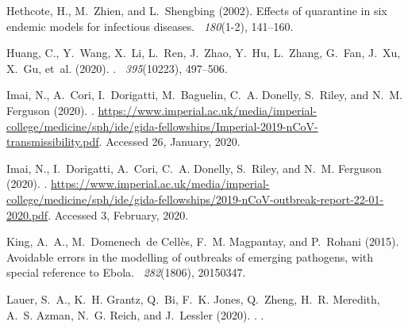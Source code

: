 \documentclass[12pt]{article}
\begin{document}
\begin{thebibliography}{}
Hethcote, H., M.~Zhien, and L.~Shengbing (2002).
\newblock Effects of quarantine in six endemic models for infectious diseases.
~{\em 180\/}(1-2), 141--160.

Huang, C., Y.~Wang, X.~Li, L.~Ren, J.~Zhao, Y.~Hu, L.~Zhang, G.~Fan, J.~Xu,
  X.~Gu, et~al. (2020).
.
~{\em 395\/}(10223), 497--506.

Imai, N., A.~Cori, I.~Dorigatti, M.~Baguelin, C.~A. Donelly, S.~Riley, and
  N.~M. Ferguson (2020).
.
\newblock
  \url{https://www.imperial.ac.uk/media/imperial-college/medicine/sph/ide/gida-fellowships/Imperial-2019-nCoV-transmissibility.pdf}.
  Accessed 26, January, 2020.

Imai, N., I.~Dorigatti, A.~Cori, C.~A. Donelly, S.~Riley, and N.~M. Ferguson
  (2020).
.
\newblock
  \url{https://www.imperial.ac.uk/media/imperial-college/medicine/sph/ide/gida-fellowships/2019-nCoV-outbreak-report-22-01-2020.pdf}.
  Accessed 3, February, 2020.

King, A.~A., M.~Domenech~de Cell{\`e}s, F.~M. Magpantay, and P.~Rohani (2015).
\newblock Avoidable errors in the modelling of outbreaks of emerging pathogens,
  with special reference to {Ebola}.
~{\em 282\/}(1806), 20150347.

Lauer, S.~A., K.~H. Grantz, Q.~Bi, F.~K. Jones, Q.~Zheng, H.~R. Meredith, A.~S.
  Azman, N.~G. Reich, and J.~Lessler (2020).
.
.


\end{thebibliography}
\end{document}
